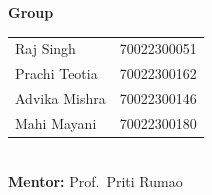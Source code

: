 \documentclass{article}
\begin{document}
\begin{minipage}[t]{0.235\linewidth}
\begin{tcolorbox}[colback=nmlight, colframe=nm, boxrule=1.2pt, arc=2mm, left=5mm, right=5mm]
{\fontsize{22}{27}\selectfont\bfseries\rmfamily\color{nm} Group}\\[1mm]
{\fontsize{18}{23}\selectfont
\begin{tabular}{@{}ll@{}}
Raj Singh & 70022300051 \\
Prachi Teotia & 70022300162 \\
Advika Mishra & 70022300146 \\
Mahi Mayani & 70022300180 \\
\end{tabular}\\[2mm]
\textbf{Mentor:} Prof.\ Priti Rumao}
\end{tcolorbox}
\end{minipage}
\end{document}
